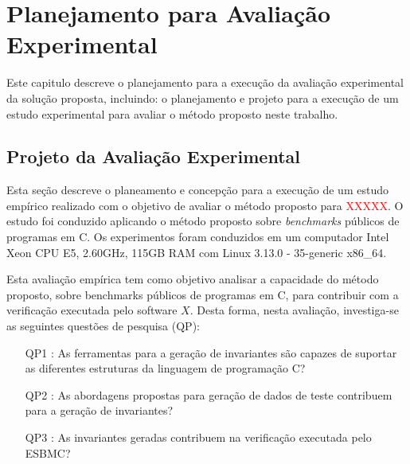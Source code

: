 
\chapter{Planejamento para Avaliação Experimental}
\label{chap:planavaexp}


Este capitulo descreve o planejamento para a execução da avaliação experimental da solução proposta, incluindo: o planejamento e projeto para a execução de um estudo experimental para avaliar o método proposto 
neste trabalho.

\section{Projeto da Avaliação Experimental}
\label{sub:experimento}


Esta seção descreve o planeamento e concepção para a execução de um estudo empírico realizado com o objetivo de avaliar o método proposto para \textcolor{red}{XXXXX}. O estudo foi conduzido aplicando o método proposto sobre \textit{benchmarks} públicos de programas em C. Os experimentos foram conduzidos em um computador Intel Xeon CPU E5, 2.60GHz, 115GB RAM com Linux 3.13.0 - 35-generic x86\_64.


Esta avaliação empírica tem como objetivo analisar a capacidade do método proposto, sobre benchmarks públicos de programas em C, para contribuir com a verificação executada pelo software $X$. Desta forma, nesta avaliação, investiga-se as seguintes questões de pesquisa (QP):

\begin{itemize}
    \item[QP1]: As ferramentas para a geração de invariantes são capazes de suportar as diferentes estruturas da linguagem de programação C?
    \item[QP2]: As abordagens propostas para geração de dados de teste contribuem para a geração de invariantes?
    \item[QP3]: As invariantes geradas contribuem na verificação executada pelo ESBMC?
\end{itemize}

